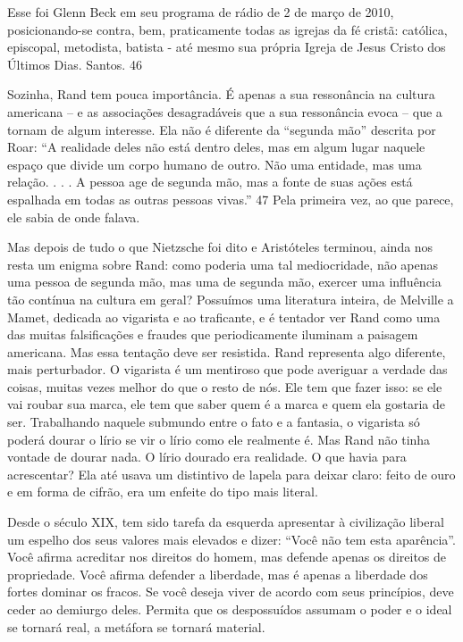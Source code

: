  
\par
 
Esse foi Glenn Beck em seu programa de rádio de 2 de março de 2010, posicionando-se contra, bem, praticamente todas as igrejas da fé cristã: católica, episcopal, metodista, batista - até mesmo sua própria Igreja de Jesus Cristo dos Últimos Dias. Santos.
 {\color{blue} 46}  

 
\par
 
Sozinha, Rand tem pouca importância. É apenas a sua ressonância na cultura americana – e as associações desagradáveis ​​que a sua ressonância evoca – que a tornam de algum interesse. Ela não é diferente da “segunda mão” descrita por Roar: “A realidade deles não está dentro deles, mas em algum lugar naquele espaço que divide um corpo humano de outro. Não uma entidade, mas uma relação. . . . A pessoa age de segunda mão, mas a fonte de suas ações está espalhada em todas as outras pessoas vivas.”
 {\color{blue} 47}  
Pela primeira vez, ao que parece, ele sabia de onde falava.
 
\par
 
Mas depois de tudo o que Nietzsche foi dito e Aristóteles terminou, ainda nos resta um enigma sobre Rand: como poderia uma tal mediocridade, não apenas uma pessoa de segunda mão, mas uma de segunda mão, exercer uma influência tão contínua na cultura em geral? Possuímos uma literatura inteira, de Melville a Mamet, dedicada ao vigarista e ao traficante, e é tentador ver Rand como uma das muitas falsificações e fraudes que periodicamente iluminam a paisagem americana. Mas essa tentação deve ser resistida. Rand representa algo diferente, mais perturbador. O vigarista é um mentiroso que pode averiguar a verdade das coisas, muitas vezes melhor do que o resto de nós. Ele tem que fazer isso: se ele vai roubar sua marca, ele tem que saber quem é a marca e quem ela gostaria de ser. Trabalhando naquele submundo entre o fato e a fantasia, o vigarista só poderá dourar o lírio se vir o lírio como ele realmente é. Mas Rand não tinha vontade de dourar nada. O lírio dourado era realidade. O que havia para acrescentar? Ela até usava um distintivo de lapela para deixar claro: feito de ouro e em forma de cifrão, era um enfeite do tipo mais literal.
 
\par
 
Desde o século XIX, tem sido tarefa da esquerda apresentar à civilização liberal um espelho dos seus valores mais elevados e dizer: “Você não tem esta aparência”. Você afirma acreditar nos direitos do homem, mas defende apenas os direitos de propriedade. Você afirma defender a liberdade, mas é apenas a liberdade dos fortes dominar os fracos. Se você deseja viver de acordo com seus princípios, deve ceder ao demiurgo deles. Permita que os despossuídos assumam o poder e o ideal se tornará real, a metáfora se tornará material.
 
